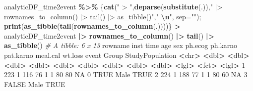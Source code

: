 \documentclass[
]{article}
\newenvironment{Shaded}{\begin{snugshade}}{\end{snugshade}}
\newcommand{\AttributeTok}[1]{\textcolor[rgb]{0.13,0.29,0.53}{#1}}
\newcommand{\CommentTok}[1]{\textcolor[rgb]{0.56,0.35,0.01}{\textit{#1}}}
\newcommand{\ConstantTok}[1]{\textcolor[rgb]{0.56,0.35,0.01}{#1}}
\newcommand{\DecValTok}[1]{\textcolor[rgb]{0.00,0.00,0.81}{#1}}
\newcommand{\ErrorTok}[1]{\textcolor[rgb]{0.64,0.00,0.00}{\textbf{#1}}}
\newcommand{\FunctionTok}[1]{\textcolor[rgb]{0.13,0.29,0.53}{\textbf{#1}}}
\newcommand{\NormalTok}[1]{#1}
\newcommand{\SpecialCharTok}[1]{\textcolor[rgb]{0.81,0.36,0.00}{\textbf{#1}}}
\newcommand{\StringTok}[1]{\textcolor[rgb]{0.31,0.60,0.02}{#1}}
\begin{document}
\begin{Shaded}
\begin{Highlighting}[]
\NormalTok{analyticDF\_time2event }\SpecialCharTok{\%\textgreater{}\%}\NormalTok{ \{}\FunctionTok{cat}\NormalTok{(}\StringTok{" \textgreater{} "}\NormalTok{,}\FunctionTok{deparse}\NormalTok{(}\FunctionTok{substitute}\NormalTok{(.)),}\StringTok{" |\textgreater{} rownames\_to\_column() |\textgreater{} tail() |\textgreater{} as\_tibble()"}\NormalTok{,}\StringTok{"  }\SpecialCharTok{\textbackslash{}n}\StringTok{"}\NormalTok{, }\AttributeTok{sep=}\StringTok{""}\NormalTok{); }\FunctionTok{print}\NormalTok{(}\FunctionTok{as\_tibble}\NormalTok{(}\FunctionTok{tail}\NormalTok{(}\FunctionTok{rownames\_to\_column}\NormalTok{(.))))\}}
 \SpecialCharTok{\textgreater{}}\NormalTok{ analyticDF\_time2event }\SpecialCharTok{|\textgreater{}} \FunctionTok{rownames\_to\_column}\NormalTok{() }\SpecialCharTok{|\textgreater{}} \FunctionTok{tail}\NormalTok{() }\SpecialCharTok{|\textgreater{}} \FunctionTok{as\_tibble}\NormalTok{()  }
\CommentTok{\# A tibble: 6 x 13}
\NormalTok{  rowname  inst  time   age   sex ph.ecog ph.karno pat.karno meal.cal wt.loss event Group  StudyPopulation}
  \SpecialCharTok{\textless{}}\NormalTok{chr}\SpecialCharTok{\textgreater{}}   \ErrorTok{\textless{}}\NormalTok{dbl}\SpecialCharTok{\textgreater{}} \ErrorTok{\textless{}}\NormalTok{dbl}\SpecialCharTok{\textgreater{}} \ErrorTok{\textless{}}\NormalTok{dbl}\SpecialCharTok{\textgreater{}} \ErrorTok{\textless{}}\NormalTok{dbl}\SpecialCharTok{\textgreater{}}   \ErrorTok{\textless{}}\NormalTok{dbl}\SpecialCharTok{\textgreater{}}    \ErrorTok{\textless{}}\NormalTok{dbl}\SpecialCharTok{\textgreater{}}     \ErrorTok{\textless{}}\NormalTok{dbl}\SpecialCharTok{\textgreater{}}    \ErrorTok{\textless{}}\NormalTok{dbl}\SpecialCharTok{\textgreater{}}   \ErrorTok{\textless{}}\NormalTok{dbl}\SpecialCharTok{\textgreater{}} \ErrorTok{\textless{}}\NormalTok{lgl}\SpecialCharTok{\textgreater{}} \ErrorTok{\textless{}}\NormalTok{fct}\SpecialCharTok{\textgreater{}}  \ErrorTok{\textless{}}\NormalTok{lgl}\SpecialCharTok{\textgreater{}}          
\DecValTok{1} \DecValTok{223}         \DecValTok{1}   \DecValTok{116}    \DecValTok{76}     \DecValTok{1}       \DecValTok{1}       \DecValTok{80}        \DecValTok{80}       \ConstantTok{NA}       \DecValTok{0} \ConstantTok{TRUE}\NormalTok{  Male   }\ConstantTok{TRUE}           
\DecValTok{2} \DecValTok{224}         \DecValTok{1}   \DecValTok{188}    \DecValTok{77}     \DecValTok{1}       \DecValTok{1}       \DecValTok{80}        \DecValTok{60}       \ConstantTok{NA}       \DecValTok{3} \ConstantTok{FALSE}\NormalTok{ Male   }\ConstantTok{TRUE}           

\end{Highlighting}
\end{Shaded}
\end{document}
